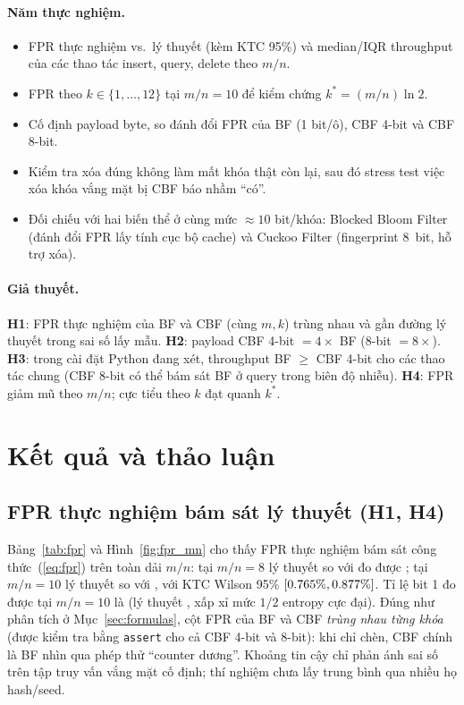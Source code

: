 \documentclass[11pt,a4paper]{article}
\begin{document}
\paragraph{Năm thực nghiệm.}
\begin{itemize}
  \item[\textbf{E1}] FPR thực nghiệm vs.\ lý thuyết (kèm KTC 95\%) và
        median/IQR throughput của các thao tác insert, query, delete
        theo $m/n$.
  \item[\textbf{E2}] FPR theo $k\in\{1,\dots,12\}$ tại $m/n=10$ để kiểm chứng
        $k^*=(m/n)\ln 2$.
  \item[\textbf{E3}] Cố định payload \BudgetBytes{} byte, so đánh đổi FPR của
        BF (1 bit/ô), CBF 4-bit và CBF 8-bit.
  \item[\textbf{E4}] Kiểm tra xóa đúng không làm mất khóa thật còn lại, sau
        đó stress test việc xóa khóa vắng mặt bị CBF báo nhầm ``có''.
  \item[\textbf{E5}] Đối chiếu với hai biến thể ở cùng mức ${\approx}10$
        bit/khóa: Blocked Bloom Filter (đánh đổi FPR lấy tính cục bộ cache)
        và Cuckoo Filter (fingerprint 8~bit, hỗ trợ xóa).
\end{itemize}

\paragraph{Giả thuyết.}
\textbf{H1}: FPR thực nghiệm của BF và CBF (cùng $m,k$) trùng nhau và gần
đường lý thuyết trong sai số lấy mẫu. \textbf{H2}: payload CBF 4-bit
$=4\times$ BF (8-bit $=8\times$). \textbf{H3}: trong cài đặt Python đang xét,
throughput BF $\ge$ CBF 4-bit cho các thao tác chung (CBF 8-bit có thể bám
sát BF ở query trong biên độ nhiễu).
\textbf{H4}: FPR giảm mũ theo $m/n$; cực tiểu theo $k$ đạt quanh $k^*$.

\section{Kết quả và thảo luận}
\subsection{FPR thực nghiệm bám sát lý thuyết (H1, H4)}
\label{sec:e1result}
Bảng~\ref{tab:fpr} và Hình~\ref{fig:fpr_mn} cho thấy FPR thực nghiệm bám sát
công thức~(\ref{eq:fpr}) trên toàn dải $m/n$: tại $m/n=8$ lý thuyết
\FprThEight{} so với đo được \FprEmpEight{}; tại $m/n=10$ lý thuyết
\FprThTen{} so với \FprEmpTen{}, với KTC Wilson 95\%
$[0.765\%{},0.877\%{}]$. Tỉ lệ bit 1 đo được tại $m/n=10$ là
\FillEmpTen{} (lý thuyết \FillThTen{}, xấp xỉ mức $1/2$ entropy cực đại).
Đúng như phân tích ở Mục~\ref{sec:formulas}, cột FPR của BF và CBF
\emph{trùng nhau từng khóa} (được kiểm tra bằng \texttt{assert} cho cả CBF
4-bit và 8-bit): khi chỉ chèn, CBF chính là BF nhìn qua phép thử ``counter
dương''. Khoảng tin cậy chỉ phản ánh sai số trên tập truy vấn vắng mặt cố định;
thí nghiệm chưa lấy trung bình qua nhiều họ hash/seed.
\end{document}
